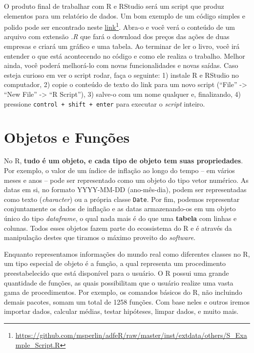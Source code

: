 \documentclass[
  11pt,
]{book}
\begin{document}
O produto final de trabalhar com R e RStudio será um script que produz elementos para um relatório de dados. Um bom exemplo de um código simples e polido pode ser encontrado neste \href{https://github.com/msperlin/adfeR/raw/master/inst/extdata/others/S_Example_Script.R}{link}\footnote{\url{https://github.com/msperlin/adfeR/raw/master/inst/extdata/others/S_Example_Script.R}}. Abra-o e você verá o conteúdo de um arquivo com extensão \emph{.R} que fará o download dos preços das ações de duas empresas e criará um gráfico e uma tabela. Ao terminar de ler o livro, você irá entender o que está acontecendo no código e como ele realiza o trabalho. Melhor ainda, você poderá melhorá-lo com novas funcionalidades e novas saídas. Caso esteja curioso em ver o script rodar, faça o seguinte: 1) instale R e RStudio no computador, 2) copie o conteúdo de texto do link para um novo script (``File'' -\textgreater{} ``New File'' -\textgreater{} ``R Script''), 3) salve-o com um nome qualquer e, finalizando, 4) pressione \texttt{control\ +\ shift\ +\ enter} para executar o \emph{script} inteiro.

\hypertarget{objetos-e-funuxe7uxf5es}{%
\section{Objetos e Funções}\label{objetos-e-funuxe7uxf5es}}

No R, \textbf{tudo é um objeto, e cada tipo de objeto tem suas propriedades}. Por exemplo, o valor de um índice de inflação ao longo do tempo -- em vários meses e anos -- pode ser representado como um objeto do tipo vetor numérico. As datas em si, no formato YYYY-MM-DD (ano-mês-dia), podem ser representadas como texto (\emph{character}) ou a própria classe \texttt{Date}. Por fim, podemos representar conjuntamente os dados de inflação e as datas armazenando-os em um objeto único do tipo \emph{dataframe}, o qual nada mais é do que uma \textbf{tabela} com linhas e colunas. Todos esses objetos fazem parte do ecossistema do R e é através da manipulação destes que tiramos o máximo proveito do \emph{software}.

Enquanto representamos informações do mundo real como diferentes classes no R, um tipo especial de objeto é a função, a qual representa um procedimento preestabelecido que está disponível para o usuário. O R possui uma grande quantidade de funções, as quais possibilitam que o usuário realize uma vasta gama de procedimentos. Por exemplo, os comandos básicos do R, não incluindo demais pacotes, somam um total de 1258 funções. Com base neles e outros iremos importar dados, calcular médias, testar hipóteses, limpar dados, e muito mais.
\end{document}
